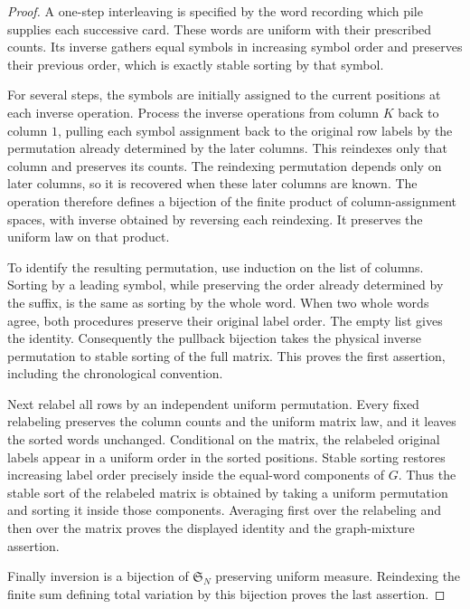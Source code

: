 \documentclass[11pt]{article}
\numberwithin{equation}{section}
\theoremstyle{definition}
\theoremstyle{remark}
\newcommand{\1}{\mathbf 1}
\begin{document}
\begin{proof}
A one-step interleaving is specified by the word recording which
pile supplies each successive card. These words are uniform with
their prescribed counts. Its inverse gathers equal symbols in
increasing symbol order and preserves their previous order, which
is exactly stable sorting by that symbol.

For several steps, the symbols are initially assigned to the current
positions at each inverse operation. Process the inverse operations
from column $K$ back to column $1$, pulling each symbol assignment
back to the original row labels by the permutation already determined
by the later columns. This reindexes only that column and preserves
its counts. The reindexing permutation depends only on later columns,
so it is recovered when these later columns are known. The operation
therefore defines a bijection of the finite product of column-assignment
spaces, with inverse obtained by reversing each reindexing. It
preserves the uniform law on that product.

To identify the resulting permutation, use induction on the list of
columns. Sorting by a leading symbol, while preserving the order
already determined by the suffix, is the same as sorting by the
whole word. When two whole words agree, both procedures preserve
their original label order. The empty list gives the identity.
Consequently the pullback bijection takes the physical inverse
permutation to stable sorting of the full matrix. This proves the
first assertion, including the chronological convention.

Next relabel all rows by an independent uniform permutation. Every
fixed relabeling preserves the column counts and the uniform matrix
law, and it leaves the sorted words unchanged. Conditional on the
matrix, the relabeled original labels appear in a uniform order in
the sorted positions. Stable sorting restores increasing label
order precisely inside the equal-word components of $G$. Thus the
stable sort of the relabeled matrix is obtained by taking a uniform
permutation and sorting it inside those components. Averaging first
over the relabeling and then over the matrix proves the displayed
identity and the graph-mixture assertion.

Finally inversion is a bijection of $\mathfrak S_N$ preserving
uniform measure. Reindexing the finite sum defining total variation
by this bijection proves the last assertion.
\end{proof}
\end{document}
